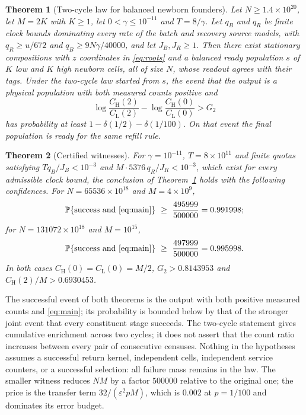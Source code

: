 \documentclass[11pt,a4paper]{article}
\theoremstyle{plain}
\newtheorem{theorem}{Theorem}[section]
\theoremstyle{definition}
\theoremstyle{remark}
\newcommand{\Prob}{\mathbb P}
\newcommand{\eps}{\varepsilon}
\newcommand{\lo}{\mathrm L}
\newcommand{\hi}{\mathrm H}
\begin{document}
\begin{theorem}[Two-cycle law for balanced newborn founders]\label{thm:law}
Let $N\ge1.4\times10^{20}$, let $M=2K$ with $K\ge1$, let $0<\gamma\le10^{-11}$ and $T=8/\gamma$. Let $q_B$ and $q_R$ be finite clock bounds dominating every rate of the batch and recovery source models, with $q_R\ge u/672$ and $q_B\ge9N\gamma/40000$, and let $J_B,J_R\ge1$. Then there exist stationary compositions with $z$ coordinates in \eqref{eq:roots} and a balanced ready population $s$ of $K$ low and $K$ high newborn cells, all of size $N$, whose readout agrees with their tags. Under the two-cycle law started from $s$, the event that the output is a physical population with both measured counts positive and
\begin{equation}\label{eq:main}
\log\frac{C_\hi(2)}{C_\lo(2)}-\log\frac{C_\hi(0)}{C_\lo(0)}>G_2
\end{equation}
has probability at least $1-\delta(1/2)-\delta(1/100)$. On that event the final population is ready for the same refill rule.
\end{theorem}

\begin{theorem}[Certified witnesses]\label{thm:witness}
For $\gamma=10^{-11}$, $T=8\times10^{11}$ and finite quotas satisfying $Tq_B/J_B<10^{-3}$ and $M\cdot5376\,q_R/J_R<10^{-3}$, which exist for every admissible clock bound, the conclusion of Theorem~\ref{thm:law} holds with the following confidences. For $N=65536\times10^{18}$ and $M=4\times10^{9}$,
\[
\Prob\{\text{success and \eqref{eq:main}}\}\ \ge\ \frac{495999}{500000}=0.991998;
\]
for $N=131072\times10^{18}$ and $M=10^{15}$,
\[
\Prob\{\text{success and \eqref{eq:main}}\}\ \ge\ \frac{497999}{500000}=0.995998 .
\]
In both cases $C_\hi(0)=C_\lo(0)=M/2$, $G_2>0.8143953$ and $C_\hi(2)/M>0.6930453$.
\end{theorem}

The successful event of both theorems is the output with both positive measured counts and \eqref{eq:main}; its probability is bounded below by that of the stronger joint event that every constituent stage succeeds. The two-cycle statement gives cumulative enrichment across two cycles; it does not assert that the count ratio increases between every pair of consecutive censuses. Nothing in the hypotheses assumes a successful return kernel, independent cells, independent service counters, or a successful selection: all failure mass remains in the law. The smaller witness reduces $NM$ by a factor $500000$ relative to the original one; the price is the transfer term $32/(\eps^2pM)$, which is $0.002$ at $p=1/100$ and dominates its error budget.
\end{document}
